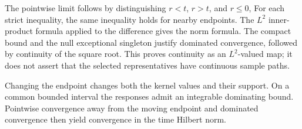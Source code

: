 \documentclass[11pt,a4paper]{article}
\begin{document}
The pointwise limit follows by distinguishing \(r<t\), \(r>t\), and \(r\le0\), For each strict inequality, the same inequality holds for nearby endpoints. The \(L^{2}\) inner-product formula applied to the difference gives the norm formula. The compact bound and the null exceptional singleton justify dominated convergence, followed by continuity of the square root. This proves continuity as an \(L^{2}\)-valued map; it does not assert that the selected representatives have continuous sample paths.



Changing the endpoint changes both the kernel values and their support. On a common bounded interval the responses admit an integrable dominating bound. Pointwise convergence away from the moving endpoint and dominated convergence then yield convergence in the time Hilbert norm.
\end{document}
